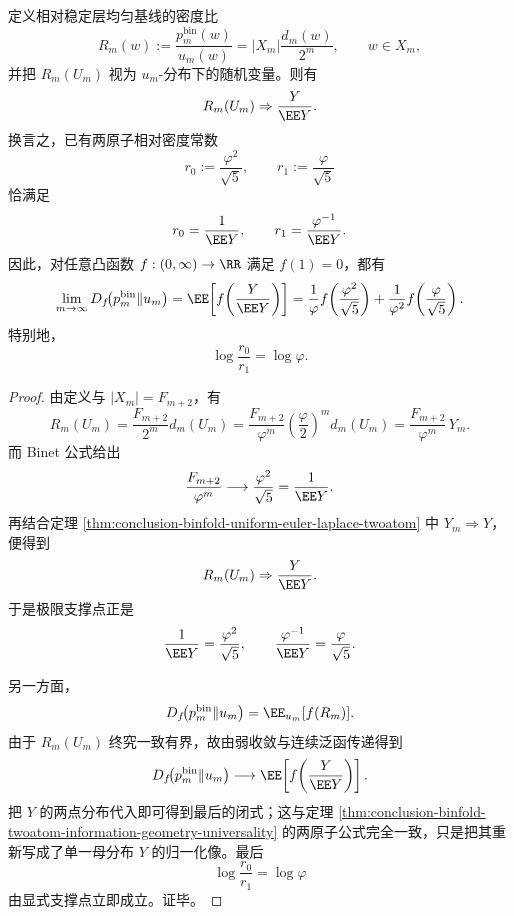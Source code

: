 \begin{theorem}[相对密度二原子极限的归一化同一性]\label{thm:conclusion-binfold-relative-density-normalized-mother-law}
定义相对稳定层均匀基线的密度比
\[
R_m(w):=\frac{p_m^{\mathrm{bin}}(w)}{u_m(w)}
=
|X_m|\frac{d_m(w)}{2^m},
\qquad
w\in X_m,
\]
并把 \(R_m(U_m)\) 视为 \(u_m\)-分布下的随机变量。则有
\[
R_m(U_m)\Rightarrow \frac{Y}{\EE Y}.
\]
换言之，已有两原子相对密度常数
\[
r_0:=\frac{\varphi^2}{\sqrt5},
\qquad
r_1:=\frac{\varphi}{\sqrt5}
\]
恰满足
\[
r_0=\frac{1}{\EE Y},
\qquad
r_1=\frac{\varphi^{-1}}{\EE Y}.
\]
因此，对任意凸函数 \(f:(0,\infty)\to\RR\) 满足 \(f(1)=0\)，都有
\[
\lim_{m\to\infty}D_f\!\bigl(p_m^{\mathrm{bin}}\Vert u_m\bigr)
=
\EE\!\left[f\!\left(\frac{Y}{\EE Y}\right)\right]
=
\frac{1}{\varphi}f\!\left(\frac{\varphi^2}{\sqrt5}\right)
+
\frac{1}{\varphi^2}f\!\left(\frac{\varphi}{\sqrt5}\right).
\]
特别地，
\[
\log\frac{r_0}{r_1}=\log\varphi.
\]
\end{theorem}
\begin{proof}
由定义与 \(|X_m|=F_{m+2}\)，有
\[
R_m(U_m)
=
\frac{F_{m+2}}{2^m}d_m(U_m)
=
\frac{F_{m+2}}{\varphi^m}
\left(\frac{\varphi}{2}\right)^m d_m(U_m)
=
\frac{F_{m+2}}{\varphi^m}\,Y_m.
\]
而 Binet 公式给出
\[
\frac{F_{m+2}}{\varphi^m}\longrightarrow \frac{\varphi^2}{\sqrt5}
=
\frac{1}{\EE Y}.
\]
再结合定理 \ref{thm:conclusion-binfold-uniform-euler-laplace-twoatom} 中 \(Y_m\Rightarrow Y\)，便得到
\[
R_m(U_m)\Rightarrow \frac{Y}{\EE Y}.
\]
于是极限支撑点正是
\[
\frac{1}{\EE Y}=\frac{\varphi^2}{\sqrt5},
\qquad
\frac{\varphi^{-1}}{\EE Y}=\frac{\varphi}{\sqrt5}.
\]

另一方面，
\[
D_f\!\bigl(p_m^{\mathrm{bin}}\Vert u_m\bigr)
=
\EE_{u_m}[f(R_m)].
\]
由于 \(R_m(U_m)\) 终究一致有界，故由弱收敛与连续泛函传递得到
\[
D_f\!\bigl(p_m^{\mathrm{bin}}\Vert u_m\bigr)
\longrightarrow
\EE\!\left[f\!\left(\frac{Y}{\EE Y}\right)\right].
\]
把 \(Y\) 的两点分布代入即可得到最后的闭式；这与定理 \ref{thm:conclusion-binfold-twoatom-information-geometry-universality} 的两原子公式完全一致，只是把其重新写成了单一母分布 \(Y\) 的归一化像。最后
\[
\log\frac{r_0}{r_1}
=
\log\varphi
\]
由显式支撑点立即成立。证毕。
\end{proof}

